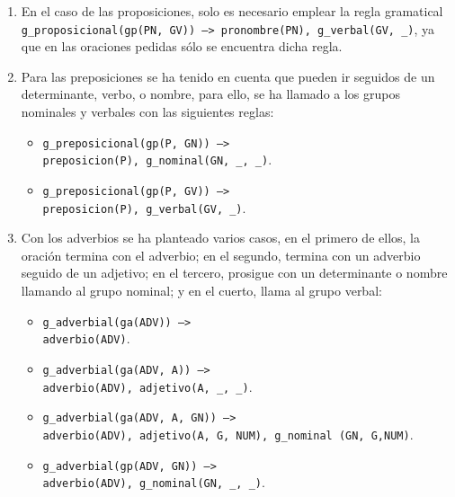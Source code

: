 \documentclass[a4paper]{article}
\begin{document}
\begin{enumerate}
\begin{itemize}
            \end{itemize}

        \item En el caso de las proposiciones, solo es necesario emplear la regla gramatical \texttt{g\_proposicional(gp(PN, GV)) --> pronombre(PN), g\_verbal(GV, \_)}, ya que en las oraciones pedidas sólo se encuentra dicha regla.

        \item Para las preposiciones se ha tenido en cuenta que pueden ir seguidos de un determinante, verbo, o nombre, para ello, se ha llamado a los grupos nominales y verbales con las siguientes reglas:

            \begin{itemize}

                \item \texttt{g\_preposicional(gp(P, GN)) -->\\ preposicion(P), g\_nominal(GN, \_, \_)}.

                \item \texttt{g\_preposicional(gp(P, GV)) -->\\ preposicion(P), g\_verbal(GV, \_)}.

            \end{itemize}

        \item Con los adverbios se ha planteado varios casos, en el primero de ellos, la oración termina con el adverbio; en el segundo, termina con un adverbio seguido de un adjetivo; en el tercero, prosigue con un determinante o nombre llamando al grupo nominal; y en el cuerto, llama al grupo verbal:

            \begin{itemize}

                \item \texttt{g\_adverbial(ga(ADV)) -->\\ adverbio(ADV)}.

                \item \texttt{g\_adverbial(ga(ADV, A)) -->\\ adverbio(ADV), adjetivo(A, \_, \_)}.

                \item \texttt{g\_adverbial(ga(ADV, A, GN)) -->\\ adverbio(ADV), adjetivo(A, G, NUM), g\_nominal (GN, G,NUM)}.

                \item \texttt{g\_adverbial(gp(ADV, GN)) -->\\ adverbio(ADV), g\_nominal(GN, \_, \_)}.


\end{itemize}
\end{enumerate}
\end{document}
